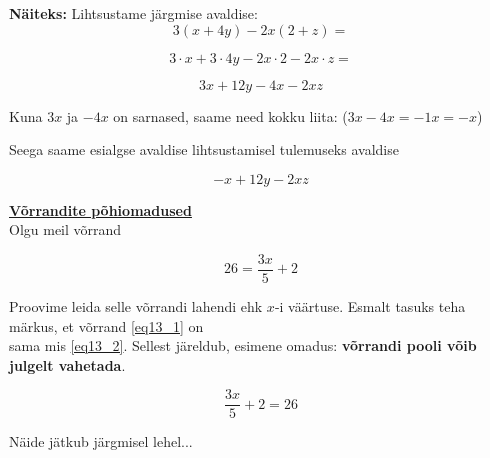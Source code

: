 \begin{center}
{{{\begin{flushleft}
\vspace{2mm}
\hspace{5mm} \textbf{Näiteks:} Lihtsustame järgmise avaldise: \[ 3(x+4y)-2x(2+z)= \]

\[ 3 \cdot x + 3 \cdot 4y - 2x \cdot 2 - 2x \cdot z= \]

 \[ 3x + 12y - 4x -2xz \]

\hspace{5mm} Kuna $3x$ ja $-4x$ on sarnased, saame need kokku liita: ($3x-4x=-1x=-x$)

\hspace{5mm}
Seega saame esialgse avaldise lihtsustamisel tulemuseks avaldise

\[ -x + 12y-2xz\]

\vspace{5mm}
\hspace{5mm} \textbf{\underline{Võrrandite põhiomadused}}\\
\vspace{5mm}
\hspace{5mm} Olgu meil võrrand

\begin{equation}
\label{eq13_1}
26 = \dfrac{3x}{5}+2
\end{equation}

\vspace{2mm}
\hspace{5mm} Proovime leida selle võrrandi lahendi ehk $x$-i väärtuse. Esmalt tasuks teha märkus, et võrrand \ref{eq13_1} on\\ \hspace{5mm} sama mis \ref{eq13_2}. Sellest järeldub, esimene omadus: \textbf{võrrandi pooli võib julgelt vahetada}.

\begin{equation}
\label{eq13_2}
\dfrac{3x}{5}+2 = 26
\end{equation}

\hspace{5mm} Näide jätkub järgmisel lehel...


\end{flushleft}
}}}
\end{center}



\newpage

